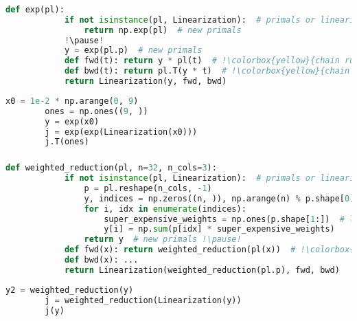 \documentclass[aspectratio=169,xcolor=dvipsnames]{beamer}
\begin{document}
\begin{frame}[fragile]
	\frametitle{\insertsection}
	\framesubtitle{\insertsubsection}

	\begin{lstlisting}[language=python,escapechar=!]
		def exp(pl):
			if not isinstance(pl, Linearization):  # primals or linearization
				return np.exp(pl)  # new primals
			!\pause!
			y = exp(pl.p)  # new primals
			def fwd(t): return y * pl(t)  # !\colorbox{yellow}{chain rule: $J_{\exp,\mathrm{pl.p}} \cdot J_\mathrm{pl} \cdot t$}!
			def bwd(t): return pl.T(y * t)  # !\colorbox{yellow}{chain rule: $J^\dagger_\mathrm{pl} \cdot J^\dagger_{\exp,\mathrm{pl.p}} \cdot t$}!
			return Linearization(y, fwd, bwd)
	\end{lstlisting}

	\pause
	\begin{lstlisting}[language=python,escapechar=!]
		x0 = 1e-2 * np.arange(0, 9)
		ones = np.ones((9, ))
		y = exp(x0)
		j = exp(exp(Linearization(x0)))
		j.T(ones)
	\end{lstlisting}

\end{frame}

\begin{frame}[fragile]
	\frametitle{\insertsection}
	\framesubtitle{\insertsubsection}

	\begin{lstlisting}[language=python,escapechar=!]
		def weighted_reduction(pl, n=32, n_cols=3):
			if not isinstance(pl, Linearization):  # primals or linearization
				p = pl.reshape(n_cols, -1)
				y, indices = np.zeros((n, )), np.arange(n) % p.shape[0]
				for i, idx in enumerate(indices):
					super_expensive_weights = np.ones(p.shape[1:])  # large weights
					y[i] = np.sum(p[idx] * super_expensive_weights)
				return y  # new primals !\pause!
			def fwd(x): return weighted_reduction(pl(x))  # !\colorbox{yellow}{ref. to self}!
			def bwd(x): ...
			return Linearization(weighted_reduction(pl.p), fwd, bwd)
	\end{lstlisting}

	\pause
	\begin{lstlisting}[language=python,escapechar=!]
		y2 = weighted_reduction(y)
		j = weighted_reduction(Linearization(y))
		j(y)
	\end{lstlisting}

\end{frame}
\end{document}

